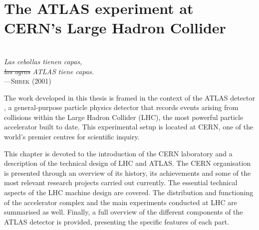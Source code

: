 \begin{comment}
%
asdf
\end{comment}


\chapter{The ATLAS experiment at CERN's Large Hadron Collider}

\vspace*{0.1 cm} 
\hspace*{200pt} \\
\hspace*{120pt} \textit{Las cebollas tienen capas,} \\
\hspace*{120pt} \textit{\sout{los ogros} ATLAS tiene capas.} \\
\hspace*{140pt} ---\textsc{Shrek (2001)} \\%
\vspace*{2cm} 

\label{chap:ATLAS}

The work developed in this thesis is framed in the context of the ATLAS detector \cite{ATLAS:1999vwa}, 
a general-purpose particle physics detector that records events arising from collisions within the 
Large Hadron Collider (LHC), the most powerful particle accelerator built to date. 
This experimental setup is located at CERN, one of the world's premier centres for scientific inquiry.

This chapter is devoted to the introduction of the CERN laboratory and a description of the technical
design of LHC and ATLAS.
The CERN organisation is presented through an overview of its history, its achievements and 
some of the most relevant research projects carried out currently.
The essential technical aspects of the LHC machine design are covered. The distribution and functioning of the
accelerator complex and the main experiments conducted at LHC are summarised as well. 
Finally, a full overview of the different components of the ATLAS detector is provided, presenting
the specific features of each part.




